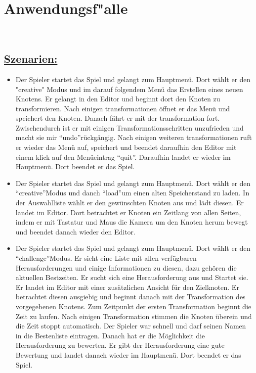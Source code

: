 %
%


\section{Anwendungsf{"a}lle}
\label{NU:AF}~\\



\subsection*{\underline{Szenarien:}}

\begin{itemize}	
\item Der Spieler startet das Spiel und gelangt zum Hauptmenü. Dort wählt er den "creative" Modus und im darauf folgendem Menü das Erstellen eines neuen Knotens. Er gelangt in den Editor und beginnt dort den Knoten zu transformieren. Nach einigen transformationen öffnet er das Menü und speichert den Knoten. Danach fährt er mit der transformation fort. Zwischendurch ist er mit einigen Transformationsschritten unzufrieden und macht sie mir \textquotedblleft{}undo\textquotedblright rückgängig. Nach einigen weiteren transformationen ruft er wieder das Menü auf, speichert und beendet daraufhin den Editor mit einem klick auf den Menüeintrag \textquotedblleft{}quit\textquotedblright{}. Daraufhin landet er wieder im Hauptmenü. Dort beendet er das Spiel.

\item Der Spieler startet das Spiel und gelangt zum Hauptmenü. Dort wählt er den \textquotedblleft{}creative\textquotedblright Modus und danch \textquotedblleft{}load\textquotedblright um einen alten Speicherstand zu laden. In der Auswahlliste wählt er den gewünschten Knoten aus und lädt diesen. Er landet im Editor. Dort betrachtet er Knoten ein Zeitlang von allen Seiten, indem er mit Tastatur und Maus die Kamera um den Knoten herum bewegt und beendet danach wieder den Editor.

\item  Der Spieler startet das Spiel und gelangt zum Hauptmenü. Dort wählt er den \textquotedblleft{}challenge\textquotedblright Modus. Er sieht eine Liste mit allen verfügbaren Herausforderungen und einige Informationen zu diesen, dazu gehören die aktuellen Bestzeiten. Er sucht sich eine Herausforderung aus und Startet sie. Er landet im Editor mit einer zusätzlichen Ansicht für den Zielknoten. Er betrachtet diesen ausgiebig und beginnt danach mit der Transformation des vorgegebenen Knotens. Zum Zeitpunkt der ersten Transformation beginnt die Zeit zu laufen. Nach einigen Transformation stimmen die Knoten überein und die Zeit stoppt automatisch. Der Spieler war schnell und darf seinen Namen in die Bestenliste eintragen. Danach hat er die Möglichkeit die Herausforderung zu bewerten. Er gibt der Herausforderung eine gute Bewertung und landet danach wieder im Hauptmenü. Dort beendet er das Spiel.


\end{itemize}

